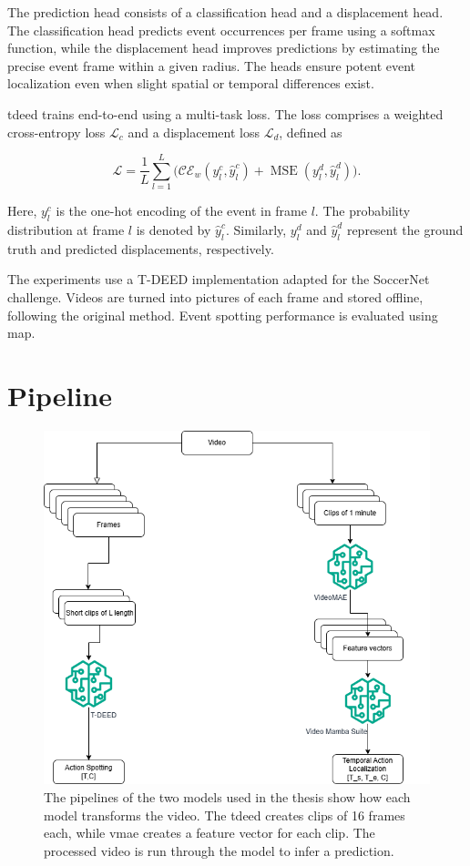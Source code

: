 The prediction head consists of a classification head and a displacement head. The classification head predicts event occurrences per frame using a softmax function, while the displacement head improves predictions by estimating the precise event frame within a given radius. The heads ensure potent event localization even when slight spatial or temporal differences exist.


\acrshort{tdeed} trains end-to-end using a multi-task loss. The loss comprises a weighted cross-entropy loss \(\mathcal{L}_c\) and a displacement loss \(\mathcal{L}_d\), defined as

\[
\mathcal{L} = \frac{1}{L}\sum_{l=1}^{L}\Big(\mathcal{CE}_{w}(y_l^{c},\hat{y}_l^c) + \operatorname{MSE}(y_l^{d},\hat{y}_l^d)\Big).
\]

Here, \(y_l^{c}\) is the one-hot encoding of the event in frame \(l\). The probability distribution at frame \(l\) is denoted by \(\hat{y}_l^c\). Similarly, \(y_l^{d}\) and \(\hat{y}_l^d\) represent the ground truth and predicted displacements, respectively.

The experiments use a T-DEED implementation adapted for the SoccerNet challenge. Videos are turned into pictures of each frame and stored offline, following the original method. Event spotting performance is evaluated using \acrlong{map}.


\section{Pipeline} 

\begin{figure}
    \centering
    \includegraphics[width=0.75\linewidth]{figures/pipeline.png}
    \caption{The pipelines of the two models used in the thesis show how each model transforms the video. The \acrshort{tdeed} creates clips of 16 frames each, while \acrshort{vmae} creates a feature vector for each clip. The processed video is run through the model to infer a prediction.}
    \label{fig:pipeline}
\end{figure}

